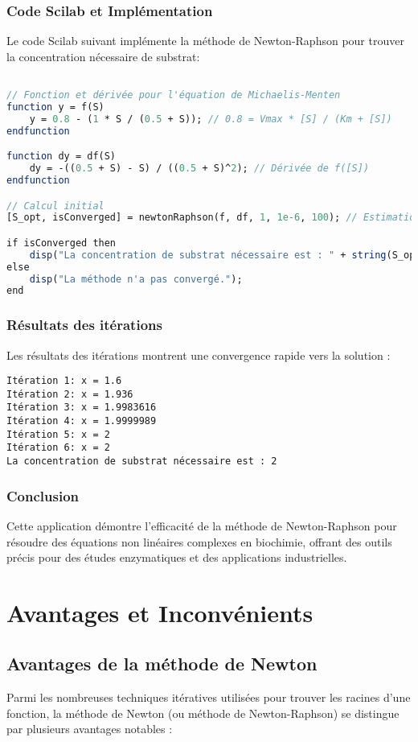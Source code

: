 \documentclass{article}
\begin{document}
\subsubsection{Code Scilab et Implémentation}
Le code Scilab suivant implémente la méthode de Newton-Raphson pour trouver la concentration nécessaire de substrat:

\begin{lstlisting}[language=Scilab]

// Fonction et dérivée pour l'équation de Michaelis-Menten
function y = f(S)
    y = 0.8 - (1 * S / (0.5 + S)); // 0.8 = Vmax * [S] / (Km + [S])
endfunction

function dy = df(S)
    dy = -((0.5 + S) - S) / ((0.5 + S)^2); // Dérivée de f([S])
endfunction

// Calcul initial
[S_opt, isConverged] = newtonRaphson(f, df, 1, 1e-6, 100); // Estimation initiale [S]0 = 1

if isConverged then
    disp("La concentration de substrat nécessaire est : " + string(S_opt));
else
    disp("La méthode n'a pas convergé.");
end
\end{lstlisting}

\subsubsection{Résultats des itérations}
Les résultats des itérations montrent une convergence rapide vers la solution :
\begin{lstlisting}
Itération 1: x = 1.6
Itération 2: x = 1.936
Itération 3: x = 1.9983616
Itération 4: x = 1.9999989
Itération 5: x = 2
Itération 6: x = 2
La concentration de substrat nécessaire est : 2
\end{lstlisting}

\subsubsection{Conclusion}
Cette application démontre l'efficacité de la méthode de Newton-Raphson pour résoudre des équations non linéaires complexes en biochimie, offrant des outils précis pour des études enzymatiques et des applications industrielles.

\section{Avantages et Inconvénients}
\subsection{Avantages de la méthode de Newton}
Parmi les nombreuses techniques itératives utilisées pour trouver les racines d'une fonction, la méthode de Newton (ou méthode de Newton-Raphson) se distingue par plusieurs avantages notables :
\end{document}
